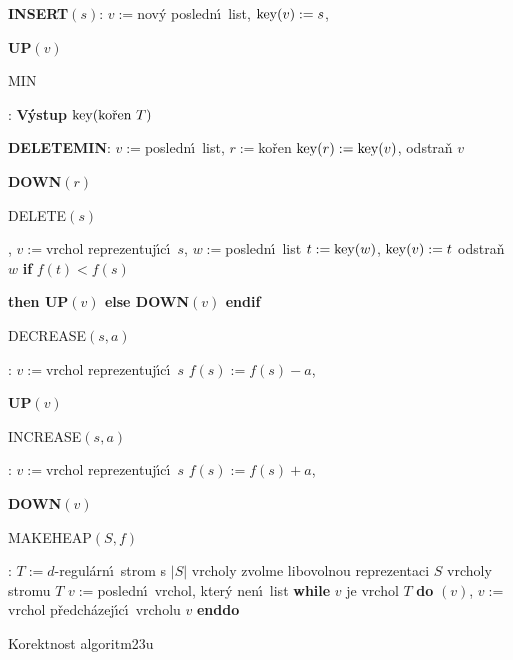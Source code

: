 {\bf INSERT$(s)$}:\newline 
$v:=$nov\'y posledn\'\i\ list, $\operatorname{key}(v):=s$, {\bf UP$(v)$
\medskip

MIN}:\newline 
{\bf V\'ystup} $\key(\text{\rm ko\v ren }T)$
\medskip

{\bf DELETEMIN}:\newline 
$v:=$posledn\'\i\ list, $r:=$ko\v ren\newline 
$\operatorname{key}(r):=\operatorname{key}(v)$, odstra\v n $v$\newline 
{\bf DOWN$(r)$
\medskip

DELETE$(s)$},\newline 
$v:=$vrchol reprezentuj\'\i c\'\i\ $s$, $w:=$posledn\'\i\ list\newline 
$t:=\operatorname{key}(w)$, $\operatorname{key}(v):=t$\newline 
odstra\v n $w$\newline 
{\bf if} $f(t)<f(s)$ {\bf then UP$(v)$ else DOWN$(v)$ endif
\medskip

DECREASE$(s,a)$}:\newline 
$v:=$vrchol reprezentuj\'\i c\'\i\ $s$\newline 
$f(s):=f(s)-a$, {\bf UP$(v)$
\medskip

INCREASE$(s,a)$}:\newline 
$v:=$vrchol reprezentuj\'\i c\'\i\ $s$\newline 
$f(s):=f(s)+a$, {\bf DOWN$(v)$
\medskip

MAKEHEAP$(S,f)$}:\newline 
$T:=d$-regul\'arn\'\i\ strom s $|S|$ vrcholy\newline 
zvolme libovolnou reprezentaci $S$ vrcholy stromu $T$\newline 
$v:=$posledn\'\i\ vrchol, kter\'y nen\'\i\ list\newline 
{\bf while} $v$ je vrchol $T$ {\bf do}\newline 
\phantom{---}{\bf DOWN}$(v)$, $v:=$vrchol p\v redch\'azej\'\i c\'\i\ vrcholu $v$\newline 
{\bf enddo}
\medskip

\subhead 
Korektnost algoritm\accent23u
\endsubhead


